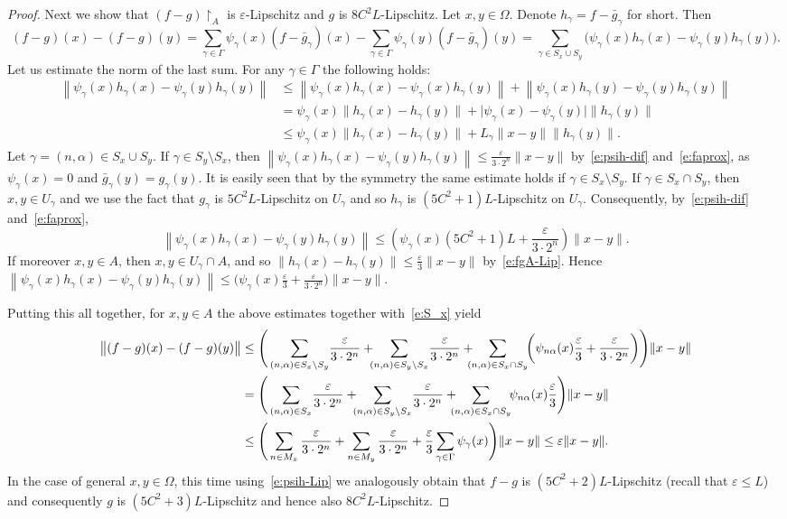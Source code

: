 \documentclass[a4paper,twoside,10pt,reqno,draft]{amsart}
\theoremstyle{definition}
\theoremstyle{remark}
\newcommand\abs[1]{\mathopen|#1\mathclose|}
\newcommand\norm[1]{\mathopen\|#1\mathclose\|}
\newcommand\norma[1]{\left\|#1\right\|}
\newcommand\normb[2]{\csname#1l\endcsname\|#2\csname#1r\endcsname\|}
\newcommand\al{\alpha}
\newcommand\ga{\gamma}
\newcommand\Ga{\Gamma}
\newcommand\ve{\varepsilon}
\newcommand\Om{\Omega}
\newcommand\restr[1]{\mathclose\restriction_{#1}}
\begin{document}
\begin{proof}
Next we show that $(f-g)\restr A$ is $\ve$-Lipschitz and $g$ is $8C^2L$-Lipschitz.
Let $x,y\in\Om$.
Denote $h_\ga=f-\bar g_\ga$ for short.
Then
\[
(f-g)(x)-(f-g)(y)=\sum_{\ga\in\Ga}\psi_\ga(x)(f-\bar g_\ga)(x)-\sum_{\ga\in\Ga}\psi_\ga(y)(f-\bar g_\ga)(y)=\!\!\!\sum_{\ga\in S_x\cup S_y}\!\!\bigl(\psi_\ga(x)h_\ga(x)-\psi_\ga(y)h_\ga(y)\bigr).
\]
Let us estimate the norm of the last sum.
For any $\ga\in\Ga$ the following holds:
\begin{equation}\label{e:psih-dif}\begin{split}
\norma{\psi_\ga(x)h_\ga(x)-\psi_\ga(y)h_\ga(y)}&\le\norma{\psi_\ga(x)h_\ga(x)-\psi_\ga(x)h_\ga(y)}+\norma{\psi_\ga(x)h_\ga(y)-\psi_\ga(y)h_\ga(y)}\\
&=\psi_\ga(x)\norm{h_\ga(x)-h_\ga(y)}+\abs{\psi_\ga(x)-\psi_\ga(y)}\norm{h_\ga(y)}\\
&\le\psi_\ga(x)\norm{h_\ga(x)-h_\ga(y)}+L_\ga\norm{x-y}\norm{h_\ga(y)}.
\end{split}\end{equation}
Let $\ga=(n,\al)\in S_x\cup S_y$.
If $\ga\in S_y\setminus S_x$, then $\norma{\psi_\ga(x)h_\ga(x)-\psi_\ga(y)h_\ga(y)}\le\frac\ve{3\cdot 2^n}\norm{x-y}$ by~\eqref{e:psih-dif} and~\eqref{e:faprox}, as $\psi_\ga(x)=0$ and $\bar g_\ga(y)=g_\ga(y)$.
It is easily seen that by the symmetry the same estimate holds if $\ga\in S_x\setminus S_y$.
If $\ga\in S_x\cap S_y$, then $x,y\in U_\ga$ and we use the fact that $g_\ga$ is $5C^2L$-Lipschitz on $U_\ga$ and so $h_\ga$ is $(5C^2+1)L$-Lipschitz on $U_\ga$.
Consequently, by~\eqref{e:psih-dif} and~\eqref{e:faprox},
\begin{equation}\label{e:psih-Lip}
\norma{\psi_\ga(x)h_\ga(x)-\psi_\ga(y)h_\ga(y)}\le\left(\psi_\ga(x)(5C^2+1)L+\frac\ve{3\cdot 2^n}\right)\norm{x-y}.
\end{equation}
If moreover $x,y\in A$, then $x,y\in U_\ga\cap A$, and so $\norm{h_\ga(x)-h_\ga(y)}\le\frac\ve3\norm{x-y}$ by~\eqref{e:fgA-Lip}.
Hence $\norma{\psi_\ga(x)h_\ga(x)-\psi_\ga(y)h_\ga(y)}\le\bigl(\psi_\ga(x)\frac\ve3+\frac\ve{3\cdot 2^n}\bigr)\norm{x-y}$.

Putting this all together, for $x,y\in A$ the above estimates together with~\eqref{e:S_x} yield
\[\begin{split}
\normb{big}{(f-g)(x)-(f-g)(y)}&\le\Biggl(\,\sum_{(n,\al)\in S_x\setminus S_y}\!\frac\ve{3\cdot 2^n}+\!\!\!\sum_{(n,\al)\in S_y\setminus S_x}\!\frac\ve{3\cdot 2^n}+\!\!\!\!\sum_{(n,\al)\in S_x\cap S_y}\!\biggl(\psi_{n\al}(x)\frac\ve3+\frac\ve{3\cdot 2^n}\biggr)\Biggr)\norm{x-y}\\
&=\Biggl(\,\sum_{(n,\al)\in S_x}\!\frac\ve{3\cdot 2^n}+\!\!\!\sum_{(n,\al)\in S_y\setminus S_x}\!\frac\ve{3\cdot 2^n}+\!\!\!\!\sum_{(n,\al)\in S_x\cap S_y}\!\!\psi_{n\al}(x)\frac\ve3\Biggr)\norm{x-y}\\
&\le\Biggl(\,\sum_{n\in M_x}\frac\ve{3\cdot 2^n}+\sum_{n\in M_y}\frac\ve{3\cdot 2^n}+\frac\ve3\sum_{\ga\in\Ga}\psi_\ga(x)\Biggr)\norm{x-y}\le\ve\norm{x-y}.
\end{split}\]
In the case of general $x,y\in\Om$, this time using~\eqref{e:psih-Lip} we analogously obtain that $f-g$ is $(5C^2+2)L$-Lipschitz (recall that $\ve\le L$)
and consequently $g$ is $(5C^2+3)L$-Lipschitz and hence also $8C^2L$-Lipschitz.


\end{proof}
\end{document}
